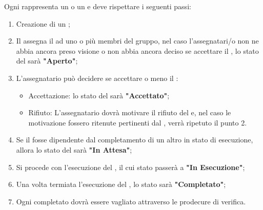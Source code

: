 \documentclass[12pt,a4paper]{article}
\begin{document}
\label{ticketCicloVita}
Ogni  rappresenta un  o un  e deve rispettare i seguenti passi:
\begin{enumerate}
	\item Creazione di un ;
	\item Il \PM{} assegna il  ad uno o più membri del gruppo, nel caso l'assegnatari/o non ne abbia ancora preso visione o non abbia ancora deciso se accettare il , lo stato del  sarà \textbf{"Aperto"};
	\item L'assegnatario può decidere se accettare o meno il :
	\begin{itemize}
		\item Accettazione: lo stato del  sarà \textbf{"Accettato"};
		\item Rifiuto: L'assegnatario dovrà motivare il rifiuto del  e, nel caso le motivazione fossero ritenute pertinenti dal \PM{}, verrà ripetuto il punto 2.
	\end{itemize}
	\item Se il  fosse dipendente dal completamento di un altro  in stato di esecuzione, allora lo stato del  sarà \textbf{"In Attesa"};
	\item Si procede con l'esecuzione del , il cui stato passerà a \textbf{"In Esecuzione"};
	\item Una volta termiata l'esecuzione del , lo stato sarà \textbf{"Completato"};
	\item Ogni  completato dovrà essere vagliato attraverso le prodecure di verifica.
\end{enumerate}
\end{document}
